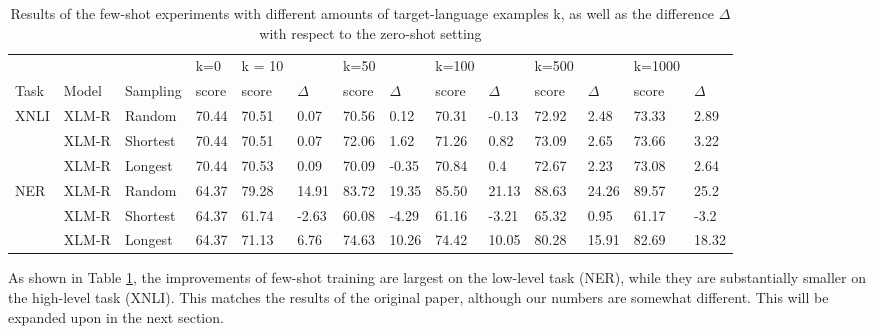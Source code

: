 \documentclass[times, utf8, seminar, english]{fer}
\begin{document}
\begin{table}[ht]
	\centering
	\resizebox{\textwidth}{!}
	{\begin{tabular}{llllllllllllll}
		\hline
		&       &           & k=0     & k = 10 &       & k=50  &       & k=100 &       & k=500 &       & k=1000 &       \\ \cline{4-14} 
		Task & Model & Sampling & score   & score  & $\Delta$ & score & $\Delta$ & score & $\Delta$ & score & $\Delta$ & score  & $\Delta$ \\ \hline
		XNLI & XLM-R     & Random    & 70.44 & 70.51  &   0.07    & 70.56 &   0.12    & 70.31 &   -0.13    & 72.92 &   2.48    & 73.33  &   2.89    \\
		& XLM-R     & Shortest  & 70.44 & 70.51  &   0.07    & 72.06 &  1.62     & 71.26 &   0.82    & 73.09 &   2.65    & 73.66  &   3.22    \\
		& XLM-R     & Longest   & 70.44 & 70.53  &    0.09   & 70.09 &   -0.35    & 70.84 &   0.4    & 72.67 &   2.23    & 73.08  &   2.64    \\ \hline
		NER  & XLM-R     & Random    & 64.37 & 79.28  &   14.91    & 83.72 &   19.35    & 85.50 &   21.13    & 88.63 &   24.26    & 89.57  &   25.2    \\
		& XLM-R    & Shortest  & 64.37 & 61.74  &    -2.63   & 60.08 &  -4.29     & 61.16 &   -3.21    & 65.32 &   0.95    & 61.17  &  -3.2    \\
		& XLM-R     & Longest   & 64.37 & 71.13  &    6.76   & 74.63 &    10.26   & 74.42 &   10.05    & 80.28 &    15.91   & 82.69  &  18.32     \\ \hline
	\end{tabular}}
	\caption{Results of the few-shot experiments with different amounts of target-language examples k, as well as the difference $\Delta$ with respect to the zero-shot setting}
	\label{tab:b}
\end{table}

As shown in Table \ref{tab:b}, the improvements of few-shot training are largest on the low-level task (NER), while they are substantially smaller on the high-level task (XNLI). This matches the results of the original paper, although our numbers are somewhat different. This will be expanded upon in the next section.

\pagebreak
\end{document}
